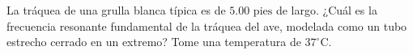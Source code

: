 \item La tráquea de una grulla blanca típica es de $5.00\text{ pies}$ de largo. ¿Cuál es la frecuencia resonante fundamental de la tráquea del ave, modelada como un tubo estrecho cerrado en un extremo? Tome una temperatura de $37^\circ\text{C}$.